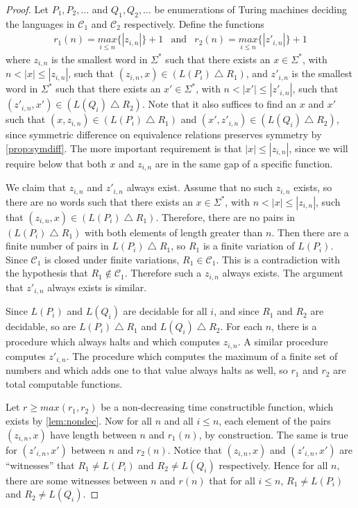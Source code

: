 \documentclass[draft]{article}
\theoremstyle{definition} \newtheorem{openproblem}[openproblem]{Open problem}
\theoremstyle{definition} \newtheorem{definition}[definition]{Definition}
\theoremstyle{remark} \newtheorem{remark}[remark]{Remark}
\newcommand{\symdiff}{\bigtriangleup} %
\newcommand{\pair}[2]{\langle#1,#2\rangle} %
\begin{document}
\begin{proof} %
  Let $P_1, P_2, \ldots$ and $Q_1, Q_2, \ldots$ be enumerations of Turing machines deciding the languages in $\mathcal{C}_1$ and $\mathcal{C}_2$ respectively.
  Define the functions
  \begin{eqnarray*}
    r_1(n)=\underset{i\leq n}{max}\{|z_{i,n}|\}+1 & \text{and} &
    r_2(n)=\underset{i\leq n}{max}\{|z'_{i,n}|\}+1
  \end{eqnarray*}
  where $z_{i,n}$ is the smallest word in $\Sigma^*$ such that there exists an $x\in\Sigma^*$, with $n<|x|\leq|z_{i,n}|$, such that $(z_{i,n}, x)\in(L(P_i)\symdiff R_1)$, and $z'_{i,n}$ is the smallest word in $\Sigma^*$ such that there exists an $x'\in\Sigma^*$, with $n<|x'|\leq|z'_{i,n}|$, such that $(z'_{i,n}, x')\in(L(Q_i)\symdiff R_2)$.
  Note that it also suffices to find an $x$ and $x'$ such that $(x, z_{i,n})\in(L(P_i)\symdiff R_1)$ and $(x', z'_{i,n})\in(L(Q_i)\symdiff R_2)$, since symmetric difference on equivalence relations preserves symmetry by \autoref{prop:symdiff}.
  The more important requirement is that $|x|\leq|z_{i,n}|$, since we will require below that both $x$ and $z_{i,n}$ are in the same gap of a specific function.

  We claim that $z_{i,n}$ and $z'_{i,n}$ always exist.
  Assume that no such $z_{i,n}$ exists, so there are no words such that there exists an $x\in\Sigma^*$, with $n<|x|\leq|z_{i,n}|$, such that $(z_{i,n}, x)\in(L(P_i)\symdiff R_1)$.
  Therefore, there are no pairs in $(L(P_i)\symdiff R_1)$ with both elements of length greater than $n$.
  Then there are a finite number of pairs in $L(P_i)\symdiff R_1$, so $R_1$ is a finite variation of $L(P_i)$.
  Since $\mathcal{C}_1$ is closed under finite variations, $R_1\in\mathcal{C}_1$.
  This is a contradiction with the hypothesis that $R_1\notin\mathcal{C}_1$.
  Therefore such a $z_{i,n}$ always exists.
  The argument that $z'_{i,n}$ always exists is similar.

  Since $L(P_i)$ and $L(Q_i)$ are decidable for all $i$, and since $R_1$ and $R_2$ are decidable, so are $L(P_i)\symdiff R_1$ and $L(Q_i)\symdiff R_2$.
  For each $n$, there is a procedure which always halts and which computes $z_{i,n}$.
  A similar procedure computes $z'_{i,n}$.
  The procedure which computes the maximum of a finite set of numbers and which adds one to that value always halts as well, so $r_1$ and $r_2$ are total computable functions.

  Let $r\ge max(r_1,r_2)$ be a non-decreasing time constructible function, which exists by \autoref{lem:nondec}.
  Now for all $n$ and all $i\leq n$, each element of the pairs $(z_{i,n},x)$ have length between $n$ and $r_1(n)$, by construction.
  The same is true for $(z'_{i,n}, x')$ between $n$ and $r_2(n)$.
  Notice that $(z_{i,n}, x)$ and $(z'_{i,n}, x')$ are ``witnesses'' that $R_1\neq L(P_i)$ and $R_2\neq L(Q_i)$ respectively.
  Hence for all $n$, there are some witnesses between $n$ and $r(n)$ that for all $i\leq n$, $R_1\neq L(P_i)$ and $R_2\neq L(Q_i)$.


\end{proof}
\end{document}

